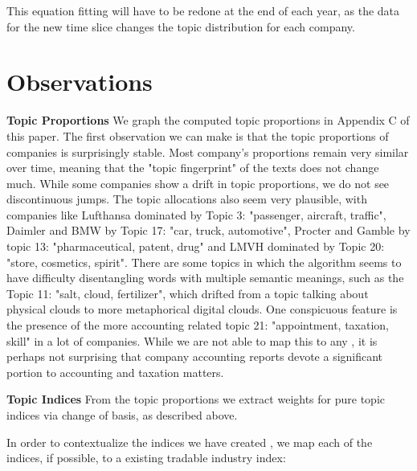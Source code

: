 \documentclass[12pt,journal,letterpaper,oneside,onecolumn]{IEEEtran}
\begin{document}
This equation fitting will have to be redone at the end of each year, as the data for the new time slice changes the topic distribution for each company. 


\section{Observations} 
\textbf{Topic Proportions}
We graph the computed topic proportions in Appendix C of this paper.
The first observation we can make is that the topic proportions of companies is surprisingly stable. 
Most company's proportions remain very similar over time, meaning that the "topic fingerprint" of the texts does not change much. While some companies show a drift in topic proportions, we do not see discontinuous jumps.
The topic allocations also seem very plausible, with companies like Lufthansa dominated by Topic 3: "passenger, aircraft, traffic", Daimler and BMW by Topic 17: "car, truck, automotive", Procter and Gamble by topic 13: "pharmaceutical, patent, drug" and LMVH dominated by Topic 20: "store, cosmetics, spirit".
There are some topics in which the algorithm seems to have difficulty disentangling words with multiple semantic meanings, such as the Topic 11: "salt, cloud, fertilizer", which drifted from a topic talking about physical clouds to more metaphorical digital clouds.
One conspicuous feature is the presence of the more accounting related topic 21: "appointment, taxation, skill" in a lot of companies.
While we are not able to map this to any , it is perhaps not surprising that company accounting reports devote a significant portion to accounting and taxation matters.


\textbf{Topic Indices}
From the topic proportions we extract weights for pure topic indices via change of basis, as described above.

In order to contextualize the indices we have created , we map each of the indices, if possible, to a existing tradable industry index:
\end{document}
